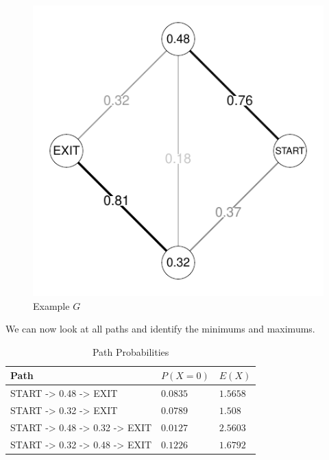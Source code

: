 \documentclass[10pt]{article}\usepackage[]{graphicx}\usepackage[]{xcolor}
\makeatletter
\def\maxwidth{ %
  \ifdim\Gin@nat@width>\linewidth
    \linewidth
  \else
    \Gin@nat@width
  \fi
}
\newenvironment{knitrout}{}{} %
\makeatother
\begin{document}
\begin{easylist}[enumerate]
\begin{knitrout}
\begin{figure}[H]
{\centering \includegraphics[width=\maxwidth]{figure/ps8_2a} 

}

\caption[Example $G$]{Example $G$\label{fig:ps8.2a} }
\end{figure}


\end{knitrout}


    We can now look at all paths and identify the minimums and maximums.

    \begin{table}[H]
        \centering
        \begin{tabular}{|l|l|l|}
            \hline
            Path & $P(X=0)$ & $E(X)$\\
            \hline
            {\ttfamily START -> 0.48 -> EXIT} &
                $0.0835$ &
                $1.5658$\\
            \hline
            {\ttfamily START -> 0.32 -> EXIT} &
                $0.0789$ &
                $1.508$\\
            \hline
            {\ttfamily START -> 0.48 -> 0.32 -> EXIT} &
                $0.0127$ &
                $2.5603$\\
            \hline
            {\ttfamily START -> 0.32 -> 0.48 -> EXIT} &
                $0.1226$ &
                $1.6792$\\
            \hline
        \end{tabular}
        \caption{Path Probabilities}
        \label{table:ring_probs}
    \end{table}


\end{easylist}
\end{document}
